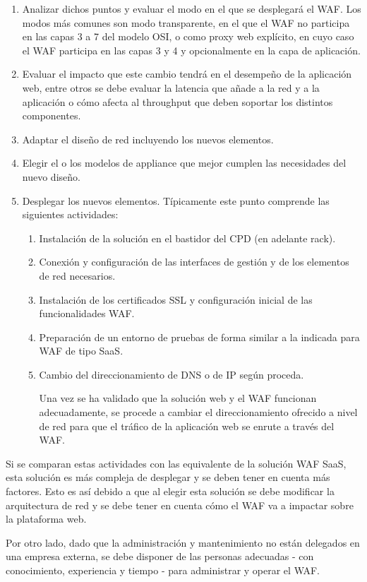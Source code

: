 \begin{enumerate}
  \item Analizar dichos puntos y evaluar el modo en el que se desplegará el WAF. Los modos más comunes son modo transparente, en
    el que el WAF no participa en las capas 3 a 7 del modelo OSI, o como proxy web explícito, en cuyo caso el WAF participa en las capas 3 y 4
    y opcionalmente en la capa de aplicación.
  \item Evaluar el impacto que este cambio tendrá en el desempeño de la aplicación web, entre otros se debe evaluar la latencia que añade a la
    red y a la aplicación o cómo afecta al throughput que deben soportar los distintos componentes.
  \item Adaptar el diseño de red incluyendo los nuevos elementos.
  \item Elegir el o los modelos de appliance que mejor cumplen las necesidades del nuevo diseño.
  \item Desplegar los nuevos elementos. Típicamente este punto comprende las siguientes actividades:
    \begin{enumerate}
      \item Instalación de la solución en el bastidor del CPD (en adelante rack).
      \item Conexión y configuración de las interfaces de gestión y de los elementos de red necesarios.
      \item Instalación de los certificados SSL y configuración inicial de las funcionalidades WAF.
      \item Preparación de un entorno de pruebas de forma similar a la indicada para WAF de tipo SaaS.
      \item Cambio del direccionamiento de DNS o de IP según proceda.
        \par Una vez se ha validado que la solución web y el WAF funcionan adecuadamente, se procede a cambiar el direccionamiento ofrecido a nivel
        de red para que el tráfico de la aplicación web se enrute a través del WAF.
    \end{enumerate}
\end{enumerate}

\par Si se comparan estas actividades con las equivalente de la solución WAF SaaS, esta solución es más compleja de desplegar y se deben tener
en cuenta más factores. Esto es así debido a que al elegir esta solución se debe modificar la arquitectura de red y se debe tener en cuenta
cómo el WAF va a impactar sobre la plataforma web.
\par Por otro lado, dado que la administración y mantenimiento no están delegados en una empresa externa, se debe disponer de las personas
adecuadas - con conocimiento, experiencia y tiempo - para administrar y operar el WAF.

